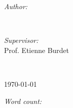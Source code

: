 \begin{titlepage}
\begin{minipage}{0.4\textwidth}
\begin{flushleft} \large
\emph{Author:}\\
\@author %
\end{flushleft}
\end{minipage}
~
\begin{minipage}{0.4\textwidth}
\begin{flushright} \large
\emph{Supervisor:} \\
Prof. Etienne Burdet \\[1.2em] %
\end{flushright}
\end{minipage}\\[4cm]
\makeatother


{\large \today}\\[2cm] %

\begin{flushright} \large
\emph{Word count:} \\[1.2em] %
\end{flushright}

\vfill %

\end{titlepage}